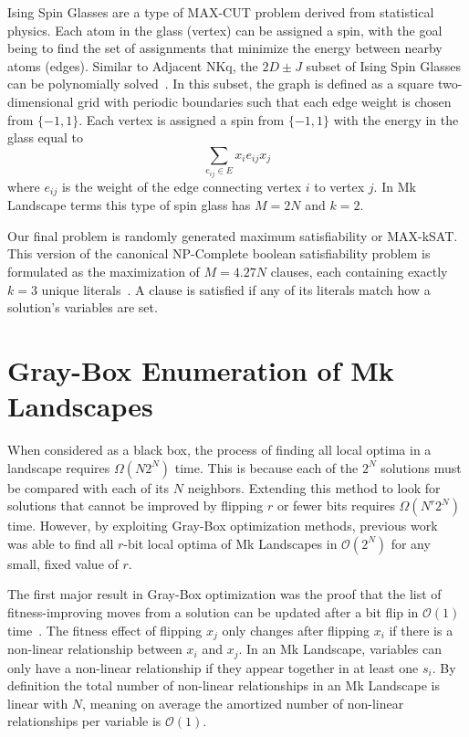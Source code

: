 \documentclass[runningheads,a4paper]{llncs}
\newcommand{\BigO}[1]{$\mathcal{O}{(#1)}$}
\begin{document}
Ising Spin Glasses are a type of MAX-CUT problem derived from statistical physics.
Each atom in the glass (vertex) can be assigned a spin, with the goal being to
find the set of assignments that minimize the energy between nearby atoms (edges).
Similar to Adjacent NKq, the $2D\pm J$ subset of Ising Spin Glasses can be polynomially
solved~\cite{saul:1994:spinglass}.
In this subset, the graph is defined as a square two-dimensional grid with
periodic boundaries such that each edge
weight is chosen from $\{-1, 1\}$. Each vertex is assigned a spin from $\{-1, 1\}$ with
the energy in the glass equal to
\begin{equation}
\sum_{e_{ij} \in E} x_ie_{ij}x_j
  \label{eq-ising}
\end{equation}
where $e_{ij}$ is the weight of the edge connecting vertex $i$ to vertex $j$. In Mk Landscape terms
this type of spin glass has $M=2N$ and $k=2$.

Our final problem is randomly generated maximum satisfiability or MAX-kSAT.
This version of the canonical NP-Complete boolean satisfiability problem is formulated
as the maximization of $M=4.27N$ clauses, each containing exactly $k=3$ unique literals~\cite{selman:1996:maxsat}.
A clause is satisfied if any of its literals match how a solution's variables are set.

\section{Gray-Box Enumeration of Mk Landscapes}
\label{sec-gray-box}
When considered as a black box, the process of finding all local optima
in a landscape requires $\Omega(N2^N)$ time. This is because each
of the $2^N$ solutions must be compared with each of its $N$ neighbors.
Extending this method to look for solutions that cannot be improved by
flipping $r$ or fewer bits requires $\Omega(N^r2^N)$ time. However,
by exploiting Gray-Box optimization methods, previous work~\cite{ochoa:2015:crossovernetworks}
was able to find all $r$-bit local optima of Mk Landscapes in \BigO{2^N} for any small,
fixed value of $r$.

The first major result in Gray-Box optimization was the proof that the list
of fitness-improving moves from a solution can be updated after a bit flip in \BigO{1}
time~\cite{whitley:2012:constant}.
The fitness effect of flipping $x_j$ only changes after flipping $x_i$ if
there is a non-linear relationship between $x_i$ and $x_j$.
In an Mk Landscape, variables
can only have a non-linear relationship if they appear together in at least one $s_i$.
By definition the total number of non-linear
relationships in an Mk Landscape is linear with $N$, meaning on average the amortized
number of non-linear relationships per variable is \BigO{1}.
\end{document}
